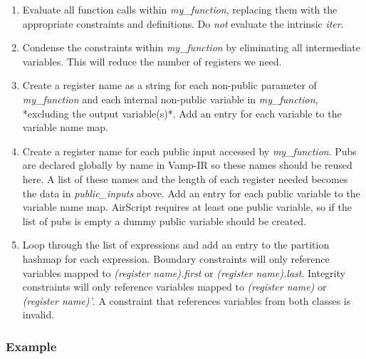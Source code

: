 \documentclass[
    9pt,            %
    techreport,        %
    affiltop,       %
]{art}
\begin{document}
\begin{enumerate}
    \item Evaluate all function calls within \textit{my\_function}, replacing them with the appropriate constraints and definitions. Do \emph{not} evaluate the intrinsic \textit{iter}.
    \item Condense the constraints within \textit{my\_function} by eliminating all intermediate variables. This will reduce the number of registers we need.
    \item Create a register name as a string for each non-public parameter of \textit{my\_function} and each internal non-public variable in \textit{my\_function}, *excluding the output variable(s)*. Add an entry for each variable to the variable name map.
    \item  Create a register name for each public input accessed by \textit{my\_function}. Pubs are declared globally by name in Vamp-IR so these names should be reused here. A list of these names and the length of each register needed becomes the data in \textit{public\_inputs} above. Add an entry for each public variable to the variable name map. AirScript requires at least one public variable, so if the list of pubs is empty a dummy public variable should be created.
    \item Loop through the list of expressions and add an entry to the partition hashmap for each expression. Boundary constraints will only reference variables mapped to \textit{(register name).first} or \textit{(register name).last}. Integrity constraints will only reference variables mapped to \textit{(register name)} or \textit{(register name)'}. A constraint that references variables from both classes is invalid.
\end{enumerate}


\subsubsection{Example}
\end{document}

